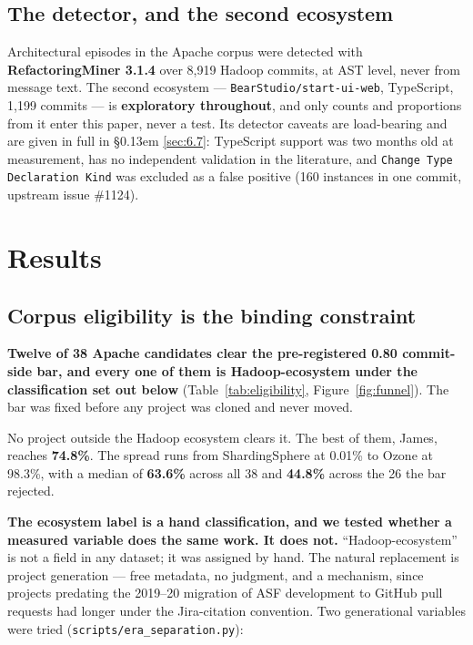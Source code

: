 \documentclass[conference]{IEEEtran}
\begin{document}
\subsection{The detector, and the second ecosystem}
\label{sec:3.4}

Architectural episodes in the Apache corpus were detected with \textbf{RefactoringMiner 3.1.4} over 8,919 Hadoop commits, at AST level, never from message text. The second ecosystem --- \texttt{BearStudio/\allowbreak{}start-\allowbreak{}ui-\allowbreak{}web}, TypeScript, 1,199 commits --- is \textbf{exploratory throughout}, and only counts and proportions from it enter this paper, never a test. Its detector caveats are load-bearing and are given in full in \S\kern0.13em \ref{sec:6.7}: TypeScript support was two months old at measurement, has no independent validation in the literature, and \texttt{Change Type Declaration Kind} was excluded as a false positive (160 instances in one commit, upstream issue \#1124).


\section{Results}
\label{sec:4}

\subsection{Corpus eligibility is the binding constraint}
\label{sec:4.1}

\textbf{Twelve of 38 Apache candidates clear the pre-registered 0.80 commit-side bar, and every one of them is Hadoop-ecosystem under the classification set out below} (Table~\ref{tab:eligibility}, Figure~\ref{fig:funnel}). The bar was fixed before any project was cloned and never moved.

No project outside the Hadoop ecosystem clears it. The best of them, James, reaches \textbf{74.8\%}. The spread runs from ShardingSphere at 0.01\% to Ozone at 98.3\%, with a median of \textbf{63.6\%} across all 38 and \textbf{44.8\%} across the 26 the bar rejected.

\textbf{The ecosystem label is a hand classification, and we tested whether a measured variable does the same work. It does not.} ``Hadoop-ecosystem'' is not a field in any dataset; it was assigned by hand. The natural replacement is project generation --- free metadata, no judgment, and a mechanism, since projects predating the 2019--20 migration of ASF development to GitHub pull requests had longer under the Jira-citation convention. Two generational variables were tried (\texttt{scripts/\allowbreak{}era\_\allowbreak{}separation.\allowbreak{}py}):
\end{document}

